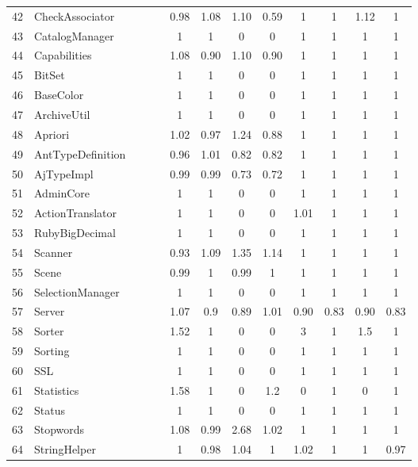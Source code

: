 \documentclass[conference]{IEEEtran}
\begin{document}
\begin{tabular}{|c|l|c|c|c|c|c|c|c|c|c|c|c|}
      42	& CheckAssociator	&&&	& 0.98	& 1.08	& 1.10 	& 0.59	& 1		& 1		&  1.12	& 1	\\
      43	& CatalogManager	&&&	& 1		& 1		& 0		& 0		& 1		& 1		& 1		& 1	\\
      44	& Capabilities		&&&	& 1.08	& 0.90	& 1.10	& 0.90	& 1		& 1		& 1		& 1	\\
      45	& BitSet			&&&	& 1		& 1		& 0		& 0		& 1		& 1		& 1		& 1	\\
      46	& BaseColor		&&&	& 1		& 1		& 0		& 0		& 1		& 1		& 1		& 1	\\
      47	& ArchiveUtil		&&&	& 1		& 1		& 0		& 0		& 1		& 1		& 1		& 1	\\
      48	& Apriori			&&&	& 1.02	& 0.97	& 1.24	& 0.88	& 1		& 1		& 1		& 1	\\
      49	& AntTypeDefinition	&&&	& 0.96	& 1.01	& 0.82	& 0.82	& 1		& 1		& 1		& 1	\\
      50	& AjTypeImpl		&&&	& 0.99	& 0.99	& 0.73	& 0.72	& 1		& 1		& 1		& 1	\\
      51	& AdminCore		&&&	& 1		& 1		& 0		& 0		& 1		& 1		& 1		& 1	\\
      52	& ActionTranslator	&&&	& 1		& 1		& 0		& 0		& 1.01	& 1		& 1		& 1	\\
      53	& RubyBigDecimal	&&&	& 1		& 1		& 0		& 0		& 1		& 1		& 1		& 1	\\
      54	& Scanner		&&&	& 0.93	& 1.09	& 1.35	& 1.14	& 1		& 1		& 1		& 1	\\
      55	& Scene			&&&	& 0.99	& 1		& 0.99	& 1		& 1		& 1		& 1		& 1	\\
      56	& SelectionManager	&&&	& 1		& 1		& 0		& 0		& 1		& 1		& 1		& 1	\\
      57	& Server			&&&	& 1.07	& 0.9	& 0.89	& 1.01	& 0.90	& 0.83	& 0.90	& 0.83	\\
      58	& Sorter			&&&	& 1.52	& 1		& 0		& 0		& 3		& 1		& 1.5	& 1	\\
      59	& Sorting			&&&	& 1		& 1		& 0		& 0		& 1		& 1		& 1		& 1	\\
      60	& SSL			&&&	& 1		& 1		& 0		& 0		& 1		& 1		& 1		& 1	\\
      61	& Statistics		&&&	& 1.58	& 1		& 0		& 1.2	& 0		& 1		& 0		& 1	\\
      62	& Status			&&&	& 1		& 1		& 0		& 0		& 1		& 1		& 1		& 1	\\
      63	& Stopwords		&&&	& 1.08	& 0.99	& 2.68	& 1.02	& 1		& 1		& 1		& 1	\\
      64	& StringHelper		&&&	& 1		& 0.98	& 1.04	& 1		& 1.02	& 1		& 1		& 0.97	\\

\end{tabular}
\end{document}
